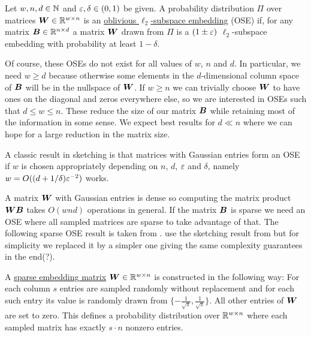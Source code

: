 \begin{definition} \label{def:oblivious-subspace-embedding}
Let \(w, n, d \in \mathbb{N}\) and \(\varepsilon, \delta \in (0, 1)\) be given.
A probability distribution \(\Pi\) over matrices \(\bm{W} \in \mathbb{R}^{w \times n}\) is an \uline{oblivious \(\ell_2\)-subspace embedding} (OSE) if, for any matrix \(\bm{B} \in \mathbb{R}^{n \times d}\) a matrix \(\bm{W}\) drawn from \(\Pi\) is a \((1\pm\varepsilon)\) \(\ell_2\)-subspace embedding with probability at least \(1 - \delta\).
\end{definition}

Of course, these OSEs do not exist for all values of \(w\), \(n\) and \(d\).
In particular, we need \(w \geq d\) because otherwise some elements in the \(d\)-dimensional column space of \(\bm{B}\) will be in the nullspace of \(\bm{W}\).
If \(w \geq n\) we can trivially choose \(\bm{W}\) to have ones on the diagonal and zeros everywhere else, so we are interested in OSEs such that \(d \leq w \leq n\).
These reduce the size of our matrix \(\bm{B}\) while retaining most of the information in some sense.
We expect best results for \(d \ll n\) where we can hope for a large reduction in the matrix size.

A classic result in sketching is that matrices with Gaussian entries form an OSE if \(w\) is chosen appropriately depending on \(n\), \(d\), \(\varepsilon\) and \(\delta\), namely \(w = O((d + 1/\delta) \varepsilon^{-2})\) works.

A matrix \(\bm{W}\) with Gaussian entries is dense so computing the matrix product \(\bm{W}\bm{B}\) takes \(O(w n d)\) operations in general.
If the matrix \(\bm{B}\) is sparse we need an OSE where all sampled matrices are sparse to take advantage of that.
The following sparse OSE result is taken from \cite{Cohen-NearlyTightObliviousSubspaceEmbeddings}.
\Textcite{Avron-FasterRandomizedInfeasibleIPMs} use the sketching result from \cite{Cohen-OptimalApproximateMatrixProduct} but for simplicity we replaced it by a simpler one giving the same complexity guarantees in the end(?).

\begin{definition}
A \uline{sparse embedding matrix} \(\bm{W} \in \mathbb{R}^{w \times n}\) is constructed in the following way:
For each column \(s\) entries are sampled randomly without replacement and for each such entry its value is randomly drawn from \(\{ - \frac{1}{\sqrt{s}}, \frac{1}{\sqrt{s}} \}\).
All other entries of \(\bm{W}\) are set to zero.
This defines a probability distribution over \(\mathbb{R}^{w \times n}\) where each sampled matrix has exactly \(s \cdot n\) nonzero entries.
\end{definition}

